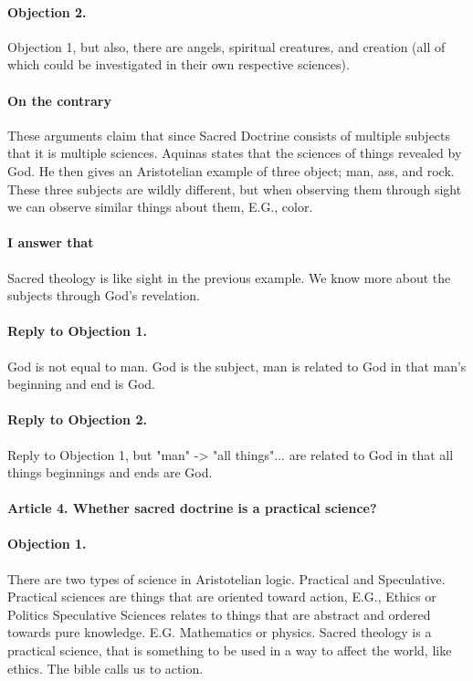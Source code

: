 \documentclass{ucetd}
\begin{document}
\paragraph{Objection 2.}
Objection 1, but also, there are angels, spiritual creatures, and creation (all of which could be investigated in their own respective sciences).
\paragraph{On the contrary}
These arguments claim that since Sacred Doctrine consists of multiple subjects that it is multiple sciences. Aquinas states that the sciences of things revealed by God. He then gives an Aristotelian example of three object; man, ass, and rock. These three subjects are wildly different, but when observing them through sight we can observe similar things about them, E.G., color.
\paragraph{I answer that}
Sacred theology is like sight in the previous example. We know more about the subjects through God's revelation.
\paragraph{Reply to Objection 1.}
God is not equal to man. God is the subject, man is related to God in that man's beginning and end is God.
\paragraph{Reply to Objection 2.}
Reply to Objection 1, but "man" -> "all things"... are related to God in that all things beginnings and ends are God.

\paragraph{Article 4. Whether sacred doctrine is a practical science?}
\paragraph{Objection 1.}
There are two types of science in Aristotelian logic. Practical and Speculative. Practical sciences are things that are oriented toward action, E.G., Ethics or Politics
Speculative Sciences relates to things that are abstract and ordered towards pure knowledge. E.G. Mathematics or physics.
Sacred theology is a practical science, that is something to be used in a way to affect the world, like ethics. The bible calls us to action.
\end{document}
